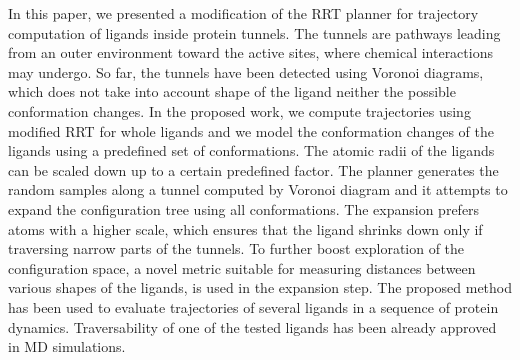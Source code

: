 \documentclass[usletter, 10pt, conference]{ieeeconf} %
\begin{document}
In this paper, we presented a modification of the RRT planner for trajectory computation of ligands inside protein tunnels.
The tunnels are pathways leading from an outer environment toward the active sites, where chemical interactions may undergo.
So far, the tunnels have been detected using Voronoi diagrams, which does not take into account shape of the ligand neither the possible 
conformation changes.
In the proposed work, we compute trajectories using modified RRT for whole ligands and we model the conformation changes of the
ligands using a predefined set of conformations.
The atomic radii of the ligands can be scaled down up to a certain predefined factor.
The planner generates the random samples along a tunnel computed by Voronoi diagram and it attempts to expand the configuration
tree using all conformations. 
The expansion prefers atoms with a higher scale, which ensures that the ligand shrinks down only if traversing narrow parts of the tunnels.
To further boost exploration of the configuration space, a novel metric suitable for measuring distances between various shapes
of the ligands, is used in the expansion step.
The proposed method has been used to  evaluate trajectories of several ligands in a sequence of protein dynamics.
Traversability of one of the tested ligands has been already approved in MD simulations.



\end{document}

